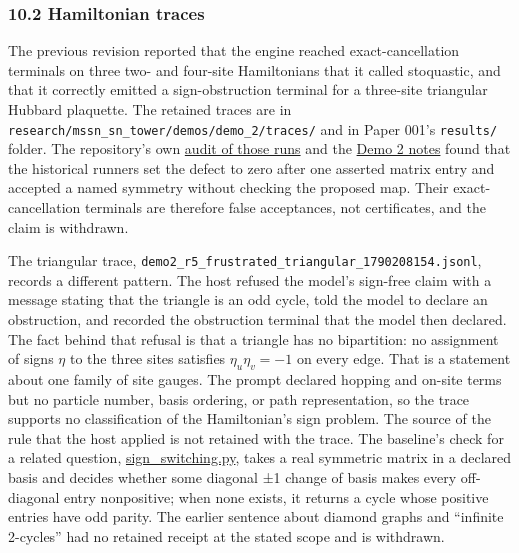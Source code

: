 \documentclass[
  11pt,
]{article}
\newcommand{\passthrough}[1]{#1}
\begin{document}
\hypertarget{hamiltonian-traces}{%
\subsubsection{10.2 Hamiltonian traces}\label{hamiltonian-traces}}

The previous revision reported that the engine reached
exact-cancellation terminals on three two- and four-site Hamiltonians
that it called stoquastic, and that it correctly emitted a
sign-obstruction terminal for a three-site triangular Hubbard plaquette.
The retained traces are in
\nolinkurl{research/mssn_sn_tower/demos/demo_2/traces/} and in Paper
001's \passthrough{\lstinline!results/!} folder. The repository's own
\href{https://github.com/dbccpage/the_symbol_game/blob/52cb5457f6c485ba548cfd292f6012a941ed22cf/research/mssn_sn_tower/demos/anti_morphism_observations.md}{audit
of those runs} and the
\href{https://github.com/dbccpage/the_symbol_game/blob/52cb5457f6c485ba548cfd292f6012a941ed22cf/research/mssn_sn_tower/demos/demo_2/2_demo.md}{Demo
2 notes} found that the historical runners set the defect to zero after
one asserted matrix entry and accepted a named symmetry without checking
the proposed map. Their exact-cancellation terminals are therefore false
acceptances, not certificates, and the claim is withdrawn.

The triangular trace,
\nolinkurl{demo2_r5_frustrated_triangular_1790208154.jsonl}, records a
different pattern. The host refused the model's sign-free claim with a
message stating that the triangle is an odd cycle, told the model to
declare an obstruction, and recorded the obstruction terminal that the
model then declared. The fact behind that refusal is that a triangle has
no bipartition: no assignment of signs \(\eta\) to the three sites
satisfies \(\eta_u\eta_v=-1\) on every edge. That is a statement about
one family of site gauges. The prompt declared hopping and on-site terms
but no particle number, basis ordering, or path representation, so the
trace supports no classification of the Hamiltonian's sign problem. The
source of the rule that the host applied is not retained with the trace.
The baseline's check for a related question,
\href{https://github.com/dbccpage/the_symbol_game/blob/52cb5457f6c485ba548cfd292f6012a941ed22cf/omega_engine_symbol_game/infrastructure/adapters/mssn_research/sign_switching.py}{sign\_switching.py},
takes a real symmetric matrix in a declared basis and decides whether
some diagonal ±1 change of basis makes every off-diagonal entry
nonpositive; when none exists, it returns a cycle whose positive entries
have odd parity. The earlier sentence about diamond graphs and
``infinite 2-cycles'' had no retained receipt at the stated scope and is
withdrawn.
\end{document}
